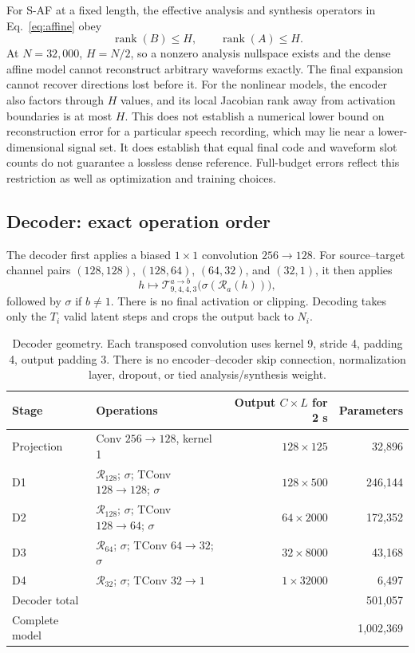 \documentclass[11pt,a4paper]{article}
\begin{document}
For S-AF at a fixed length, the effective analysis and synthesis operators in Eq.~\eqref{eq:affine} obey
\begin{equation}
 \operatorname{rank}(B)\leq H,\qquad \operatorname{rank}(A)\leq H.
\end{equation}
At $N=32{,}000$, $H=N/2$, so a nonzero analysis nullspace exists and the dense affine model cannot reconstruct arbitrary waveforms exactly. The final expansion cannot recover directions lost before it. For the nonlinear models, the encoder also factors through $H$ values, and its local Jacobian rank away from activation boundaries is at most $H$. This does not establish a numerical lower bound on reconstruction error for a particular speech recording, which may lie near a lower-dimensional signal set. It does establish that equal final code and waveform slot counts do not guarantee a lossless dense reference. Full-budget errors reflect this restriction as well as optimization and training choices.

\subsection{Decoder: exact operation order}
The decoder first applies a biased $1\times1$ convolution $256\to128$. For source--target channel pairs $(128,128)$, $(128,64)$, $(64,32)$, and $(32,1)$, it then applies
\begin{equation}
 h\longmapsto\mathcal T^{a\to b}_{9,4,4,3}\bigl(\sigma(\mathcal R_a(h))\bigr),
\end{equation}
followed by $\sigma$ if $b\ne1$. There is no final activation or clipping. Decoding takes only the $T_i$ valid latent steps and crops the output back to $N_i$.

\begin{table}[htbp]
\centering\small
\begin{tabular}{llrr}
\toprule
Stage & Operations & Output $C\times L$ for 2 s & Parameters \\
\midrule
Projection & Conv $256\to128$, kernel 1 & $128\times125$ & 32,896 \\
D1 & $\mathcal R_{128}$; $\sigma$; TConv $128\to128$; $\sigma$ & $128\times500$ & 246,144 \\
D2 & $\mathcal R_{128}$; $\sigma$; TConv $128\to64$; $\sigma$ & $64\times2000$ & 172,352 \\
D3 & $\mathcal R_{64}$; $\sigma$; TConv $64\to32$; $\sigma$ & $32\times8000$ & 43,168 \\
D4 & $\mathcal R_{32}$; $\sigma$; TConv $32\to1$ & $1\times32000$ & 6,497 \\
\midrule
Decoder total &&& 501,057 \\
Complete model &&& 1,002,369 \\
\bottomrule
\end{tabular}
\caption{Decoder geometry. Each transposed convolution uses kernel 9, stride 4, padding 4, output padding 3. There is no encoder--decoder skip connection, normalization layer, dropout, or tied analysis/synthesis weight.}
\label{tab:decoder}
\end{table}
\end{document}
